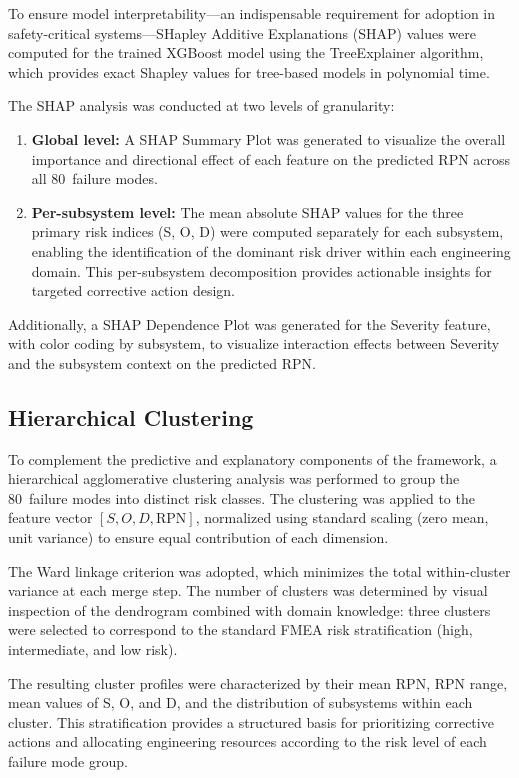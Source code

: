 To ensure model interpretability---an indispensable requirement for adoption in safety-critical systems---SHapley Additive Explanations (SHAP) values were computed for the trained XGBoost model using the TreeExplainer algorithm, which provides exact Shapley values for tree-based models in polynomial time.

The SHAP analysis was conducted at two levels of granularity:
\begin{enumerate}
\item \textbf{Global level:} A SHAP Summary Plot was generated to visualize the overall importance and directional effect of each feature on the predicted RPN across all 80~failure modes.
\item \textbf{Per-subsystem level:} The mean absolute SHAP values for the three primary risk indices (S, O, D) were computed separately for each subsystem, enabling the identification of the dominant risk driver within each engineering domain. This per-subsystem decomposition provides actionable insights for targeted corrective action design.
\end{enumerate}

Additionally, a SHAP Dependence Plot was generated for the Severity feature, with color coding by subsystem, to visualize interaction effects between Severity and the subsystem context on the predicted RPN.

\subsection{Hierarchical Clustering}
\label{subsec:clustering}

To complement the predictive and explanatory components of the framework, a hierarchical agglomerative clustering analysis was performed to group the 80~failure modes into distinct risk classes. The clustering was applied to the feature vector $[S, O, D, \text{RPN}]$, normalized using standard scaling (zero mean, unit variance) to ensure equal contribution of each dimension.

The Ward linkage criterion was adopted, which minimizes the total within-cluster variance at each merge step. The number of clusters was determined by visual inspection of the dendrogram combined with domain knowledge: three clusters were selected to correspond to the standard FMEA risk stratification (high, intermediate, and low risk).

The resulting cluster profiles were characterized by their mean RPN, RPN range, mean values of S, O, and D, and the distribution of subsystems within each cluster. This stratification provides a structured basis for prioritizing corrective actions and allocating engineering resources according to the risk level of each failure mode group.
